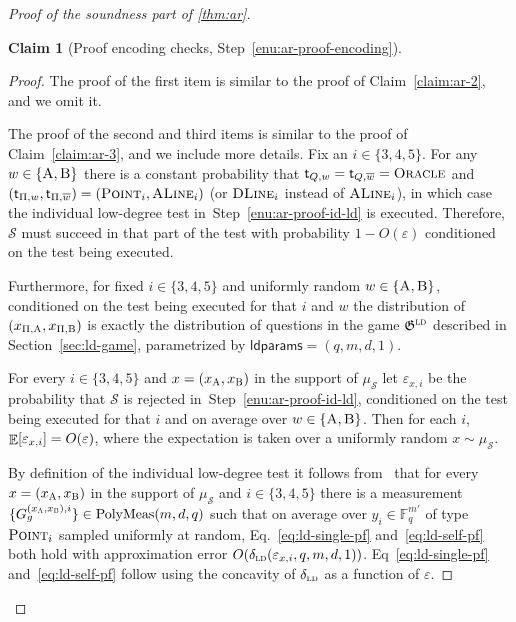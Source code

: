 \documentclass[11pt]{article}
\newtheorem{claim}[theorem]{Claim}
\theoremstyle{definition}
\newcommand{\ol}[1]{\overline{#1}}
\newcommand{\F}{\ensuremath{\mathbb{F}}}
\newcommand{\ld}{\textsc{ld}}
\newcommand{\eps}{\varepsilon}
\newcommand{\E}{\mathop{\mathbb{E}}\displaylimits}
\newcommand{\game}{\mathfrak{G}}
\newcommand{\sampler}{\mathcal{S}}
\newcommand{\strategy}{\mathscr{S}}
\newcommand{\labelstyle}[1]{\ensuremath{\textsc{#1}}\xspace}
\newcommand{\tvarstyle}[1]{\mathsf{#1}}
\newcommand{\tvar}{\ensuremath{\tvarstyle{t}}}
\newcommand{\alice}{\labelstyle{A}}
\newcommand{\bob}{\labelstyle{B}}
\newcommand{\oracle}{\labelstyle{Oracle}}
\newcommand{\typestyle}[1]{\ensuremath{\textsc{#1}}\xspace}
\newcommand{\Point}{\typestyle{Point}}
\newcommand{\ALine}{\typestyle{ALine}}
\newcommand{\DLine}{\typestyle{DLine}}
\newcommand{\ldparams}{\mathsf{ldparams}}
\newcommand{\polymeas}[3]{\mathrm{PolyMeas}(#1,#2,#3)}
\begin{document}
\begin{proof}[Proof of the soundness part of \cref{thm:ar}]
\begin{claim}[Proof encoding checks, Step~\ref{enu:ar-proof-encoding}]
\end{claim}
	
	\begin{proof} 
    The proof of the first item is similar to the proof of
    Claim~\ref{claim:ar-2}, and we omit it.

    The proof of the second and third items is similar to the proof of
    Claim~\ref{claim:ar-3}, and we include more details.
    Fix an $i\in\{3,4,5\}$.
    For any $w\in\{\alice,\bob\}$ there is a constant probability that
    $\tvar_{Q,w} = \tvar_{Q,\ol{w}} = \oracle$ and $(\tvar_{\Pi,w}, \tvar_{\Pi,
      \ol{w}}) = (\Point_i, \ALine_i)$ (or $\DLine_i$ instead of $\ALine_i$), in
    which case the individual low-degree test in~Step~\ref{enu:ar-proof-id-ld}
    is executed.
    Therefore, $\strategy$ must succeed in that part of the test with
    probability $1-O(\eps)$ conditioned on the test being executed.
					
    Furthermore, for fixed $i\in \{3,4,5\}$ and uniformly random
    $w\in\{\alice,\bob\}$, conditioned on the test being executed for that $i$
    and $w$ the distribution of $(x_{\Pi,\alice},x_{\Pi,\bob})$ is exactly the
    distribution of questions in the game $\game^\ld$ described in
    Section~\ref{sec:ld-game}, parametrized by $\ldparams = (q, m, d, 1)$.
			
    For every $i\in\{3,4,5\}$ and $x=(x_\alice,x_\bob)$ in the support of
    $\mu_\sampler$ let $\eps_{x,i}$ be the probability that $\strategy$ is
    rejected in~Step~\ref{enu:ar-proof-id-ld}, conditioned on the test being
    executed for that $i$ and on average over $w\in\{\alice,\bob\}$.
    Then for each $i$, $\E[\eps_{x,i}] = O(\eps)$, where the expectation is
    taken over a uniformly random $x\sim \mu_\sampler$.

    By definition of the individual low-degree test it follows
    from~ that for every $x=(x_\alice,x_\bob)$ in the
    support of $\mu_\sampler$ and $i\in\{3,4,5\}$ there is a measurement
    $\{G^{({x}_\alice, {x}_\bob), i}_{g}\} \in \polymeas{m}{d}{q}$ such that on
    average over $y_i\in \F_q^{m'}$ of type $\Point_i$ sampled uniformly at
    random, Eq.~\eqref{eq:ld-single-pf} and~\eqref{eq:ld-self-pf} both hold with
    approximation error $O(\delta_{\ld}(\eps_{x,i},q,m,d,1))$.
    Eq~\eqref{eq:ld-single-pf} and~\eqref{eq:ld-self-pf} follow using the concavity
    of $\delta_{\ld}$ as a function of $\eps$.


\end{proof}
\end{proof}
\end{document}
